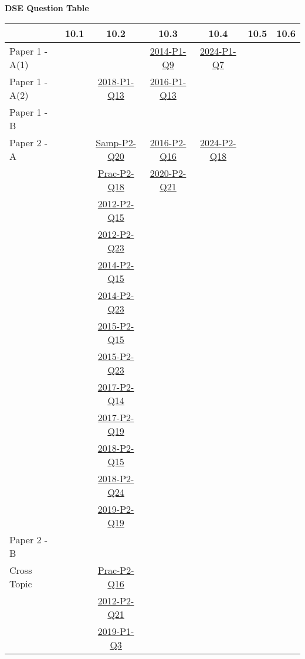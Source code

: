 \documentclass[12pt, a4paper]{article}
\begin{document}
\begin{absolutelynopagebreak}
\begin{center}
\textbf{DSE Question Table}
\end{center}
\begin{center}
\begin{tabular}{|l|c|c|c|c|c|c|}
\hline
        & 10.1 & 10.2 & 10.3 & 10.4 & 10.5 & 10.6 \\\hline
\hline
Paper 1 - A(1)&  &  & \hyperref[DSE2014-CoreP1-Q09]{2014-P1-Q9} & \hyperref[DSE2024-CoreP1-Q07]{2024-P1-Q7} &  &  \\
\hline
Paper 1 - A(2)&  & \hyperref[DSE2018-CoreP1-Q13]{2018-P1-Q13} & \hyperref[DSE2016-CoreP1-Q13]{2016-P1-Q13} &  &  &  \\
\hline
Paper 1 - B&  &  &  &  &  &  \\
\hline
\hline
Paper 2 - A&  & \hyperref[DSE2012S-CoreP2-Q20]{Samp-P2-Q20} & \hyperref[DSE2016-CoreP2-Q16]{2016-P2-Q16} & \hyperref[DSE2024-CoreP2-Q18]{2024-P2-Q18} &  &  \\
&  & \hyperref[DSE2012P-CoreP2-Q18]{Prac-P2-Q18} & \hyperref[DSE2020-CoreP2-Q21]{2020-P2-Q21} &  &  &  \\
&  & \hyperref[DSE2012-CoreP2-Q15]{2012-P2-Q15} &  &  &  &  \\
&  & \hyperref[DSE2012-CoreP2-Q23]{2012-P2-Q23} &  &  &  &  \\
&  & \hyperref[DSE2014-CoreP2-Q15]{2014-P2-Q15} &  &  &  &  \\
&  & \hyperref[DSE2014-CoreP2-Q23]{2014-P2-Q23} &  &  &  &  \\
&  & \hyperref[DSE2015-CoreP2-Q15]{2015-P2-Q15} &  &  &  &  \\
&  & \hyperref[DSE2015-CoreP2-Q23]{2015-P2-Q23} &  &  &  &  \\
&  & \hyperref[DSE2017-CoreP2-Q14]{2017-P2-Q14} &  &  &  &  \\
&  & \hyperref[DSE2017-CoreP2-Q19]{2017-P2-Q19} &  &  &  &  \\
&  & \hyperref[DSE2018-CoreP2-Q15]{2018-P2-Q15} &  &  &  &  \\
&  & \hyperref[DSE2018-CoreP2-Q24]{2018-P2-Q24} &  &  &  &  \\
&  & \hyperref[DSE2019-CoreP2-Q19]{2019-P2-Q19} &  &  &  &  \\
\hline
Paper 2 - B&  &  &  &  &  &  \\
\hline
\hline
Cross Topic&  & \hyperref[DSE2012P-CoreP2-Q16]{Prac-P2-Q16} &  &  &  &  \\
&  & \hyperref[DSE2012-CoreP2-Q21]{2012-P2-Q21} &  &  &  &  \\
&  & \hyperref[DSE2019-CoreP1-Q03]{2019-P1-Q3} &  &  &  &  \\
\hline
\end{tabular}
\end{center}
\end{absolutelynopagebreak}
\end{document}
